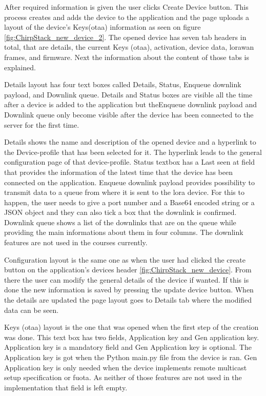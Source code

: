 After required information is given the user clicks Create Device button.
This process creates and adds the device to the application and the page uploads a layout of the device's Keys(\gls{otaa}) information as seen on figure \ref{fig:ChirpStack_new_device_2}. 
The opened device has seven tab headers in total, that are details, the current Keys (\gls{otaa}), activation, device data, \gls{lorawan} frames, and firmware.
Next the information about the content of those tabs is explained.

Details layout has four text boxes called Details, Status, Enqueue downlink payload, and Downlink queue.
Details and Status boxes are visible all the time after a device is added to the application but theEnqueue downlink payload and Downlink queue only become visible after the device has been connected to the server for the first time.

Details shows the name and description of the opened device and a hyperlink to the Device-profile that has been selected for it.
The hyperlink leads to the general configuration page of that device-profile.
Status textbox has a Last seen at field that provides the information of the latest time that the device has been connected on the application.
Enqueue downlink payload provides possibility to transmit data to a queue from where it is sent to the \gls{lora} device. For this to happen, the user needs to give a port number and a Base64 encoded string or a JSON object and they can also tick a box  that the downlink is confirmed.
Downlink queue shows  a list of the downlinks that are on the queue while providing the main informations about them in four columns.
The downlink features are not used in the courses currently.

Configuration layout is the same one as when the user had clicked the create button on the application's devices header \ref{fig:ChirpStack_new_device}.
From there the user can modify the general details of the device if wanted.
If this is done the new information is saved by pressing the update device button.
When the details are updated the page layout goes to Details tab where the modified data can be seen.

Keys (\gls{otaa}) layout is the one that was opened when the first step of the creation was done.
This text box has two fields, Application key and Gen application key.
Application key is a mandatory field and Gen Application key is optional.
The Application key is got when the Python main.py file from the device is ran.
Gen Application key is only needed when the device implements remote multicast setup specification or \gls{fuota}.
As neither of those features are not used in the implementation that field is left empty.

